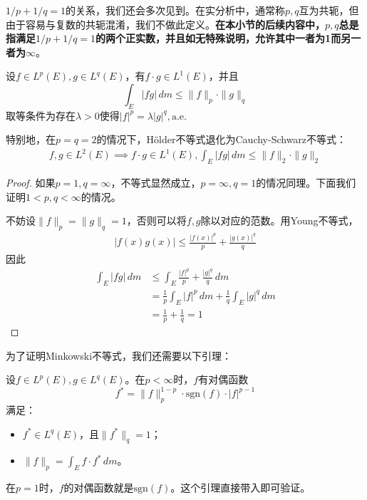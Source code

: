 \documentclass{ctexbook}
\begin{document}
$1/p+1/q=1$的关系，我们还会多次见到。在实分析中，通常称$p,q$互为共轭，但由于容易与复数的共轭混淆，我们不做此定义。\textbf{在本小节的后续内容中，$p,q$总是指满足$1/p+1/q=1$的两个正实数，并且如无特殊说明，允许其中一者为1而另一者为$\infty$}。

\begin{theorem}[Hölder不等式]
    设$f\in L^p(E),g\in L^q(E)$，有$f\cdot g\in L^1(E)$，并且
    \[\int_{E}|fg|\,dm\leq \|f\|_p\cdot \|g\|_q\]
    取等条件为存在$\lambda>0$使得$|f|^p=\lambda |g|^q,\text{a.e.}$
\end{theorem}
特别地，在$p=q=2$的情况下，Hölder不等式退化为Cauchy-Schwarz不等式：\begin{align*}
    f,g\in L^2(E)\implies f\cdot g\in L^1(E),\int_{E}|fg|\,dm\leq \|f\|_2\cdot \|g\|_2
\end{align*}
\begin{proof}
    如果$p=1,q=\infty$，不等式显然成立，$p=\infty,q=1$的情况同理。下面我们证明$1<p,q<\infty$的情况。

    不妨设$\|f\|_p=\|g\|_q=1$，否则可以将$f,g$除以对应的范数。用Young不等式，\begin{align*}
        |f(x)g(x)|\leq \frac{|f(x)|^p}{p}+\frac{|g(x)|^q}{q}
    \end{align*}
    因此\begin{align*}
        \int_{E}|fg|\,dm&\leq \int_{E}\frac{|f|^p}{p}+\frac{|g|^q}{q}\,dm\\
        &=\frac{1}{p}\int_{E}|f|^p\,dm+\frac{1}{q}\int_{E}|g|^q\,dm\\
        &=\frac{1}{p}+\frac{1}{q}=1
    \end{align*}
\end{proof}

为了证明Minkowski不等式，我们还需要以下引理：
\begin{lemma}
    设$f\in L^p(E),g\in L^q(E)$。在$p<\infty$时，$f$有对偶函数
    $$f^*=\|f\|_p^{1-p}\cdot\text{sgn}(f)\cdot |f|^{p-1}$$
    满足：\begin{itemize}
        \item $f^*\in L^q(E)$，且$\|f^*\|_q=1$；
        \item $\|f\|_p=\int_{E}f\cdot f^*\,dm$。
    \end{itemize}
\end{lemma}

在$p=1$时，$f$的对偶函数就是$\text{sgn}(f)$。这个引理直接带入即可验证。
\end{document}
